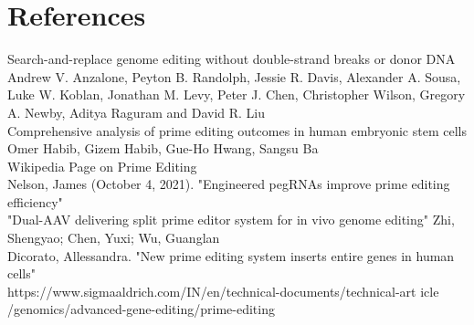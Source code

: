 \documentclass[a4paper,12pt]{extarticle}
\begin{document}
\section{References}

Search-and-replace genome editing without double-strand breaks or donor DNA Andrew V. Anzalone, Peyton B. Randolph, Jessie R. Davis, Alexander A. Sousa, Luke W. Koblan, Jonathan M. Levy, Peter J. Chen, Christopher Wilson, Gregory A. Newby, Aditya Raguram and David R. Liu\\

Comprehensive analysis of prime editing outcomes in human embryonic stem cells 
Omer Habib,  Gizem Habib,  Gue-Ho Hwang,  Sangsu Ba\\

Wikipedia Page on Prime Editing\\

Nelson, James (October 4, 2021). "Engineered pegRNAs improve prime editing efficiency"\\

 "Dual-AAV delivering split prime editor system for in vivo genome editing" Zhi, Shengyao; Chen, Yuxi; Wu, Guanglan\\
 
 Dicorato, Allessandra. "New prime editing system inserts entire genes in human cells"\\
 
https://www.sigmaaldrich.com/IN/en/technical-documents/technical-art icle /genomics/advanced-gene-editing/prime-editing
\end{document}
